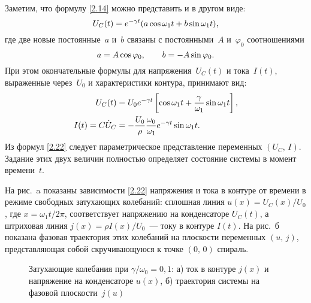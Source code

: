 Заметим, что формулу \eqref{2.14} можно представить и в другом виде:
\begin{equation*}\eqmark{2.20}
U_C(t)=e^{-\gamma t}(a\cos\omega_1 t+ b\sin\omega_1 t),
\end{equation*}
где две новые постоянные~$a$ и~$b$ связаны с постоянными~$A$ и~$\varphi_0$
соотношениями
\begin{equation*}\eqmark{2.21}
a=A \cos\varphi_0, \qquad b=-A \sin\varphi_0.
\end{equation*}
При этом окончательные формулы для напряжения~$U_C(t)$ и тока~$I(t)$, выраженные
через~$U_0$ и характеристики контура, принимают вид:
\begin{equation}
	\eqmark{2.22}
		\begin{aligned}
			U_C(t)&=U_0e^{-\gamma t}
                \left[\cos\omega_1 t + \frac{\gamma}{\omega_1}\sin\omega_1 t \right], \\
			I(t)=C\dot{U}_C&
                =-\frac{U_0}{\rho} 
                        \frac{\omega_0}{\omega_1}e^{-\gamma t}\sin\omega_1 t.
		\end{aligned}
\end{equation}
Из формул \eqref{2.22} следует параметрическое представление
 переменных 
$(U_C,\,I)$. Задание этих двух величин полностью определяет состояние
системы в момент времени~$t$.

На рис.~a показаны 
зависимости \eqref{2.22} напряжения и тока в контуре от времени в режиме
свободных затухающих колебаний: сплошная линия 
$u(x)=U_C(x)/U_0$, где $x=\omega_1t/2\pi$, 
соответствует напряжению на конденсаторе $U_C(t)$, а
штриховая линия $j(x)=\rho I(x)/U_0$~--- току в контуре $I(t)$. 
На рис.~б показана фазовая траектория этих колебаний на плоскости
переменных $(u,\,j)$, представляющая собой скручивающуюся 
к точке $(0,\,0)$ спираль.

\begin{figure}[h]
	\begin{minipage}[h]{0.5\linewidth}
		\centering
	\end{minipage}
	\hfill
	\begin{minipage}[h]{0.5\linewidth}
		\centering
	\end{minipage}
	\caption{Затухающие колебания при $\gamma/\omega_0=0,1$:
а) ток в контуре $j(x)$ и напряжение на конденсаторе $u(x)$,
б) траектория системы на фазовой плоскости~$j(u)$}
\end{figure}

